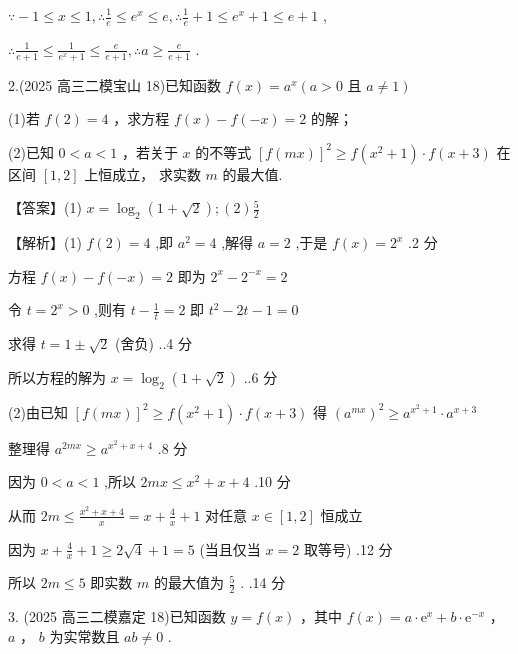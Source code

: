 \documentclass[10pt]{article}
\begin{document}
\(\because  - 1 \leq  x \leq  1,\therefore \frac{1}{e} \leq  {e}^{x} \leq  e,\therefore \frac{1}{e} + 1 \leq  {e}^{x} + 1 \leq  e + 1\) ,

\(\therefore \frac{1}{e + 1} \leq  \frac{1}{{e}^{x} + 1} \leq  \frac{e}{e + 1},\therefore a \geq  \frac{e}{e + 1}\) .

2.(2025 高三二模宝山 18)已知函数 \(f\left( x\right)  = {a}^{x}\left( {a > 0\text{ 且 }a \neq  1}\right)\)

(1)若 \(f\left( 2\right)  = 4\) ，求方程 \(f\left( x\right)  - f\left( {-x}\right)  = 2\) 的解；

(2)已知 \(0 < a < 1\) ，若关于 \(x\) 的不等式 \({\left\lbrack  f\left( mx\right) \right\rbrack  }^{2} \geq  f\left( {{x}^{2} + 1}\right)  \cdot  f\left( {x + 3}\right)\) 在区间 \(\left\lbrack  {1,2}\right\rbrack\) 上恒成立， 求实数 \(m\) 的最大值.

【答案】(1) \(x = {\log }_{2}\left( {1 + \sqrt{2}}\right) ;\left( 2\right) \frac{5}{2}\)

【解析】(1) \(f\left( 2\right)  = 4\) ,即 \({a}^{2} = 4\) ,解得 \(a = 2\) ,于是 \(f\left( x\right)  = {2}^{x}\) .2 分

方程 \(f\left( x\right)  - f\left( {-x}\right)  = 2\) 即为 \({2}^{x} - {2}^{-x} = 2\)

令 \(t = {2}^{x} > 0\) ,则有 \(t - \frac{1}{t} = 2\) 即 \({t}^{2} - {2t} - 1 = 0\)

求得 \(t = 1 \pm  \sqrt{2}\) (舍负) ..4 分

所以方程的解为 \(x = {\log }_{2}\left( {1 + \sqrt{2}}\right)\) ..6 分

(2)由已知 \({\left\lbrack  f\left( mx\right) \right\rbrack  }^{2} \geq  f\left( {{x}^{2} + 1}\right)  \cdot  f\left( {x + 3}\right)\) 得 \({\left( {a}^{mx}\right) }^{2} \geq  {a}^{{x}^{2} + 1} \cdot  {a}^{x + 3}\)

整理得 \({a}^{2mx} \geq  {a}^{{x}^{2} + x + 4}\) .8 分

因为 \(0 < a < 1\) ,所以 \({2mx} \leq  {x}^{2} + x + 4\) .10 分

从而 \({2m} \leq  \frac{{x}^{2} + x + 4}{x} = x + \frac{4}{x} + 1\) 对任意 \(x \in  \left\lbrack  {1,2}\right\rbrack\) 恒成立

因为 \(x + \frac{4}{x} + 1 \geq  2\sqrt{4} + 1 = 5\) (当且仅当 \(x = 2\) 取等号) .12 分

所以 \({2m} \leq  5\) 即实数 \(m\) 的最大值为 \(\frac{5}{2}\) . .14 分

3. (2025 高三二模嘉定 18)已知函数 \(y = f\left( x\right)\) ，其中 \(f\left( x\right)  = a \cdot  {\mathrm{e}}^{x} + b \cdot  {\mathrm{e}}^{-x}\) ， \(a\) ， \(b\) 为实常数且 \({ab} \neq  0\) .
\end{document}
